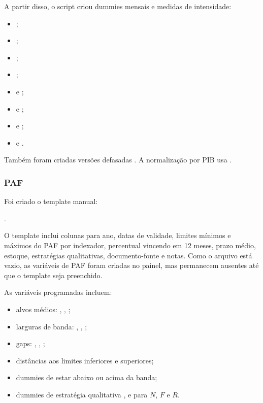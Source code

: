 \documentclass[12pt,a4paper]{article}
\begin{document}
A partir disso, o script criou dummies mensais e medidas de intensidade:

\begin{itemize}[leftmargin=1.2cm]
    \item {};
    \item {};
    \item {};
    \item {};
    \item {} e ;
    \item {} e ;
    \item {} e ;
    \item {} e .
\end{itemize}

Também foram criadas versões defasadas . A normalização por PIB usa
.

\subsubsection{PAF}

Foi criado o template manual:
\begin{center}
.
\end{center}

O template inclui colunas para ano, datas de validade, limites mínimos e máximos
do PAF por indexador, percentual vincendo em 12 meses, prazo médio, estoque,
estratégias qualitativas, documento-fonte e notas. Como o arquivo está vazio, as
variáveis de PAF foram criadas no painel, mas permanecem ausentes até que o
template seja preenchido.

As variáveis programadas incluem:

\begin{itemize}[leftmargin=1.2cm]
    \item alvos médios: , ,
    ;
    \item larguras de banda: , ,
    ;
    \item gaps: , ,
    ;
    \item distâncias aos limites inferiores e superiores;
    \item dummies de estar abaixo ou acima da banda;
    \item dummies de estratégia qualitativa ,  e
     para \(N\), \(F\) e \(R\).
\end{itemize}
\end{document}
